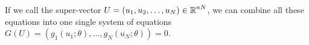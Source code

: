 If we call the super-vector $U = (u_1, u_2, \ldots, u_N) \in \operatorname{\mathbb{R}}^{nN}$, we can combine all these equations into one single system of equations $G(U) = (g_1(u_1; \theta), \ldots, g_N(u_N; \theta)) = 0$.



